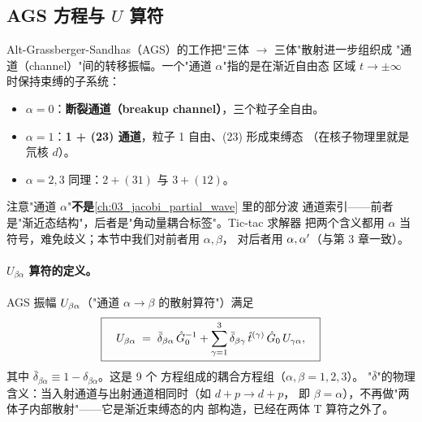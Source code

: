\subsection{AGS 方程与 \(U\) 算符}
\label{subsec:ch04-AGS}

Alt-Grassberger-Sandhas（AGS）的工作把"三体 \(\to\) 三体"散射进一步组织成
"通道（channel）"间的转移振幅。一个"通道 \(\alpha\)"指的是在渐近自由态
区域 \(t \to \pm\infty\) 时保持束缚的子系统：
\begin{itemize}
  \item \(\alpha = 0\)：\textbf{断裂通道（breakup channel）}，三个粒子全自由。
  \item \(\alpha = 1\)：\textbf{1 + (23) 通道}，粒子 1 自由、(23) 形成束缚态
        （在核子物理里就是氘核 \(d\)）。
  \item \(\alpha = 2, 3\) 同理：\(2 + (31)\) 与 \(3 + (12)\)。
\end{itemize}
注意"通道 \(\alpha\)"\textbf{不是}\cref{ch:03_jacobi_partial_wave} 里的部分波
通道索引——前者是"渐近态结构"，后者是"角动量耦合标签"。Tic-tac 求解器
把两个含义都用 \(\alpha\) 当符号，难免歧义；本节中我们对前者用 \(\alpha, \beta\)，
对后者用 \(\alpha, \alpha'\)（与第 3 章一致）。

\paragraph{\(U_{\beta\alpha}\) 算符的定义。}
AGS 振幅 \(U_{\beta\alpha}\)（"通道 \(\alpha \to \beta\) 的散射算符"）满足
\begin{equation}
\label{eq:ch04-AGS-master}
\boxed{
\quad
U_{\beta\alpha} \;=\; \bar\delta_{\beta\alpha}\,\hat{G}_0^{-1}
+ \sum_{\gamma=1}^{3} \bar\delta_{\beta\gamma}\,\hat{t}^{(\gamma)}\,\hat{G}_0\,U_{\gamma\alpha},
\quad
}
\end{equation}
其中 \(\bar\delta_{\beta\alpha} \equiv 1 - \delta_{\beta\alpha}\)。这是 9 个
方程组成的耦合方程组（\(\alpha, \beta = 1, 2, 3\)）。
"\(\bar\delta\)"的物理含义：当入射通道与出射通道相同时（如 \(d + p \to d + p\)，
即 \(\beta = \alpha\)），不再做"两体子内部散射"——它是渐近束缚态的内
部构造，已经在两体 T 算符之外了。


